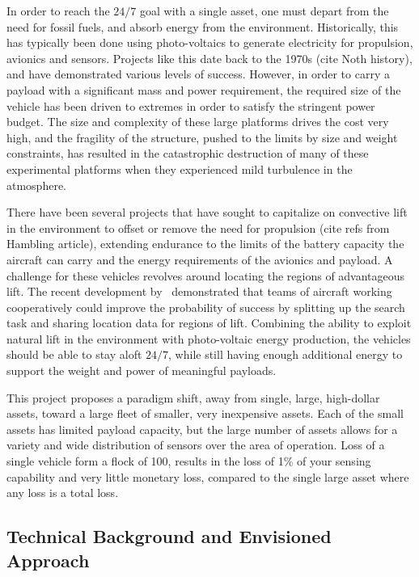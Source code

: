 \documentclass{ifacconf}
\begin{document}
In order to reach the $24/7$ goal with a single asset, one must depart from the need for fossil fuels, and absorb energy from the environment. Historically, this has typically been done using photo-voltaics to generate electricity for propulsion, avionics and sensors. Projects like this date back to the 1970s (cite Noth history), and have demonstrated various levels of success. However, in order to carry a payload with a significant mass and power requirement, the required size of the vehicle has been driven to extremes in order to satisfy the stringent power budget. The size and complexity of these large platforms drives the cost very high, and the fragility of the structure, pushed to the limits by size and weight constraints, has resulted in the catastrophic destruction of many of these experimental platforms when they experienced mild turbulence in the atmosphere.

There have been several projects that have sought to capitalize on convective lift in the environment to offset or remove the need for propulsion (cite refs from Hambling article), extending endurance to the limits of the battery capacity the aircraft can carry and the energy requirements of the avionics and payload. A challenge for these vehicles revolves around locating the regions of advantageous lift. The recent development by~\cite{AKlass_JGCD:2012,AKlass_CDC:2012} demonstrated that teams of aircraft working cooperatively could improve the probability of success by splitting up the search task and sharing location data for regions of lift. Combining the ability to exploit natural lift in the environment with photo-voltaic energy production, the vehicles should be able to stay aloft $24/7$, while still having enough additional energy to support the weight and power of meaningful payloads.

This project proposes a paradigm shift, away from single, large, high-dollar assets, toward a large fleet of smaller, very inexpensive assets. Each of the small assets has limited payload capacity, but the large number of assets allows for a variety and wide distribution of sensors over the area of operation. Loss of a single vehicle form a flock of 100, results in the loss of 1\% of your sensing capability and very little monetary loss, compared to the single large asset where any loss is a total loss.


\subsection{Technical Background and Envisioned Approach}
\end{document}
